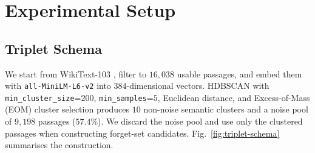 \documentclass[11pt]{article}
\begin{document}
\section{Experimental Setup}
\label{sec:setup}

\subsection{Triplet Schema}
\label{sec:triplets}

We start from WikiText-103 \citep{merity2017pointer}, filter to $16{,}038$
usable passages, and embed them with \texttt{all-MiniLM-L6-v2}
\citep{wang2020minilmv2} into $384$-dimensional vectors. HDBSCAN
\citep{campello2013density} with \texttt{min\_cluster\_size}{=}$200$,
\texttt{min\_samples}{=}$5$, Euclidean distance, and Excess-of-Mass (EOM) cluster selection
produces $10$ non-noise semantic clusters and a noise pool of $9{,}198$
passages ($57.4\%$). We discard the noise pool and use only the clustered
passages when constructing forget-set candidates. Fig.~\ref{fig:triplet-schema}
summarises the construction.
\end{document}
